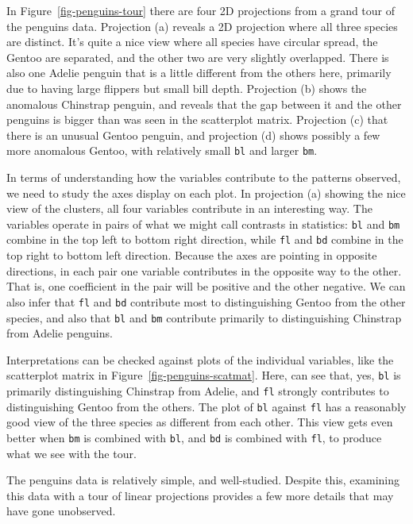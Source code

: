 \documentclass[
  letterpaper,
]{krantz}
\begin{document}
In Figure~\ref{fig-penguins-tour} there are four 2D projections from a
grand tour of the penguins data. Projection (a) reveals a 2D projection
where all three species are distinct. It's quite a nice view where all
species have circular spread, the Gentoo are separated, and the other
two are very slightly overlapped. There is also one Adelie penguin that
is a little different from the others here, primarily due to having
large flippers but small bill depth. Projection (b) shows the anomalous
Chinstrap penguin, and reveals that the gap between it and the other
penguins is bigger than was seen in the scatterplot matrix. Projection
(c) that there is an unusual Gentoo penguin, and projection (d) shows
possibly a few more anomalous Gentoo, with relatively small \texttt{bl}
and larger \texttt{bm}.

In terms of understanding how the variables contribute to the patterns
observed, we need to study the axes display on each plot. In projection
(a) showing the nice view of the clusters, all four variables contribute
in an interesting way. The variables operate in pairs of what we might
call contrasts in statistics: \texttt{bl} and \texttt{bm} combine in the
top left to bottom right direction, while \texttt{fl} and \texttt{bd}
combine in the top right to bottom left direction. Because the axes are
pointing in opposite directions, in each pair one variable contributes
in the opposite way to the other. That is, one coefficient in the pair
will be positive and the other negative. We can also infer that
\texttt{fl} and \texttt{bd} contribute most to distinguishing Gentoo
from the other species, and also that \texttt{bl} and \texttt{bm}
contribute primarily to distinguishing Chinstrap from Adelie penguins.

Interpretations can be checked against plots of the individual
variables, like the scatterplot matrix in
Figure~\ref{fig-penguins-scatmat}. Here, can see that, yes, \texttt{bl}
is primarily distinguishing Chinstrap from Adelie, and \texttt{fl}
strongly contributes to distinguishing Gentoo from the others. The plot
of \texttt{bl} against \texttt{fl} has a reasonably good view of the
three species as different from each other. This view gets even better
when \texttt{bm} is combined with \texttt{bl}, and \texttt{bd} is
combined with \texttt{fl}, to produce what we see with the tour.

The penguins data is relatively simple, and well-studied. Despite this,
examining this data with a tour of linear projections provides a few
more details that may have gone unobserved.
\end{document}
